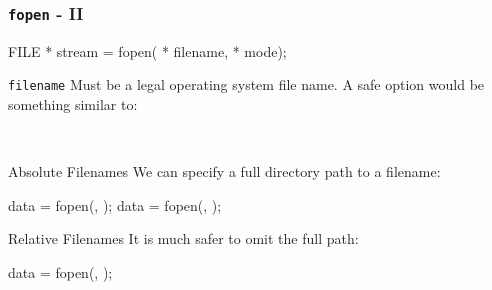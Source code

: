 \documentclass[smaller,table]{beamer}
\begin{document}
\begin{frame}[fragile]
\frametitle{{\tt fopen} - II}
\begin{semiverbatim}
\small
FILE * stream = fopen( * filename,  * mode);
\end{semiverbatim}
\begin{block}{\tt filename}
Must be a legal operating system file name. A safe option would be something similar to:
\vspace{-0.1in}
\begin{center}
\tt {}
\end{center}
\end{block}

\begin{alertblock}{Absolute Filenames}
We can specify a full directory path to a filename:
\vspace{-0.2in}
\begin{semiverbatim}
\footnotesize
data = fopen(, ); 
data = fopen(, );      
\end{semiverbatim}
\end{alertblock}

\begin{exampleblock}{Relative Filenames}
It is much safer to omit the full path:
\vspace{-0.2in}
\begin{semiverbatim}
\footnotesize
data = fopen(, ); 
\end{semiverbatim}
\end{exampleblock}
\end{frame}
\end{document}
